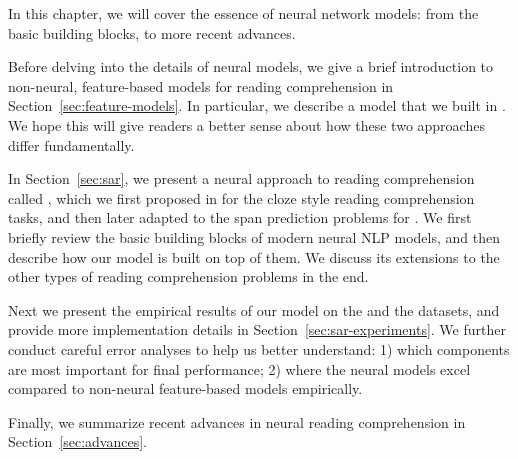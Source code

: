 

In this chapter, we will cover the essence of neural network models: from the basic building blocks, to more recent advances.

Before delving into the details of neural models, we give a brief introduction to non-neural, feature-based models for reading comprehension in Section~\ref{sec:feature-models}. In particular, we describe a model that we built in . We hope this will give readers a better sense about how these two approaches differ fundamentally.

In Section~\ref{sec:sar}, we present a neural approach to reading comprehension called , which we first proposed in  for the cloze style reading comprehension tasks, and then later adapted to the span prediction problems \cite{chen2017reading} for . We first briefly review the basic building blocks of modern neural NLP models, and then describe how our model is built on top of them. We discuss its extensions to the other types of reading comprehension problems in the end.

Next we present the empirical results of our model on the  and the  datasets, and provide more implementation details in Section~\ref{sec:sar-experiments}. We further conduct careful error analyses to help us better understand: 1) which components are most important for final performance; 2) where the neural models excel compared to non-neural feature-based models empirically.

Finally, we summarize recent advances in neural reading comprehension in Section~\ref{sec:advances}.

